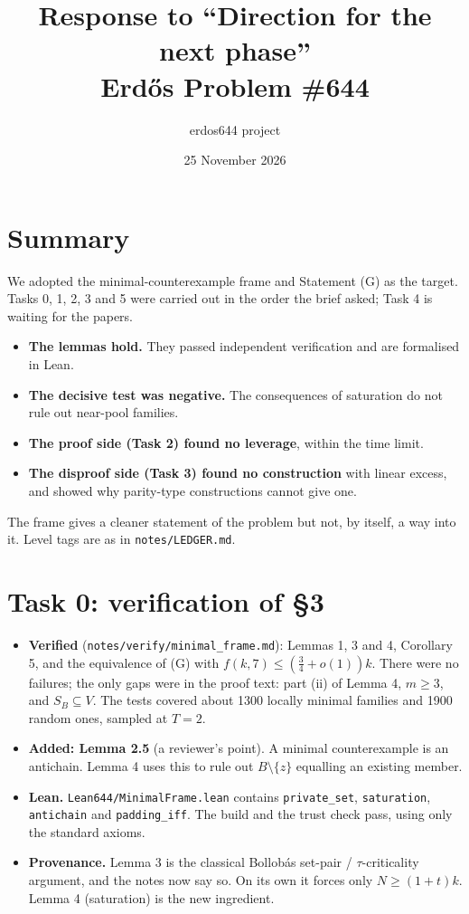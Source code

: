 \documentclass[11pt]{article}
\title{Response to ``Direction for the next phase''\\[2pt]\large Erd\H{o}s Problem \#644}
\author{erdos644 project}
\date{25 November 2026}
\begin{document}
\maketitle

\section*{Summary}
We adopted the minimal-counterexample frame and Statement (G) as the target. Tasks 0, 1, 2, 3 and 5 were carried out
in the order the brief asked; Task 4 is waiting for the papers.
\begin{itemize}
\item \textbf{The lemmas hold.} They passed independent verification and are formalised in Lean.
\item \textbf{The decisive test was negative.} The consequences of saturation do not rule out near-pool families.
\item \textbf{The proof side (Task 2) found no leverage}, within the time limit.
\item \textbf{The disproof side (Task 3) found no construction} with linear excess, and showed why parity-type
constructions cannot give one.
\end{itemize}
The frame gives a cleaner statement of the problem but not, by itself, a way into it. Level tags are as in
\texttt{notes/LEDGER.md}.

\section*{Task 0: verification of \S3}
\begin{itemize}
\item \textbf{Verified} (\texttt{notes/verify/minimal\_frame.md}): Lemmas 1, 3 and 4, Corollary 5, and the equivalence
of (G) with $f(k,7)\le(\tfrac34+o(1))k$. There were no failures; the only gaps were in the proof text: part (ii) of
Lemma 4, $m\ge3$, and $S_B\subseteq V$. The tests covered about 1300 locally minimal families and 1900 random ones,
sampled at $T=2$.
\item \textbf{Added: Lemma 2.5} (a reviewer's point). A minimal counterexample is an antichain. Lemma 4 uses this to
rule out $B\setminus\{z\}$ equalling an existing member.
\item \textbf{Lean.} \texttt{Lean644/MinimalFrame.lean} contains \texttt{private\_set}, \texttt{saturation},
\texttt{antichain} and \texttt{padding\_iff}. The build and the trust check pass, using only the standard axioms.
\item \textbf{Provenance.} Lemma 3 is the classical Bollob\'as set-pair / $\tau$-criticality argument, and the notes now
say so. On its own it forces only $N\ge(1+t)k$. Lemma 4 (saturation) is the new ingredient.
\end{itemize}
\end{document}
